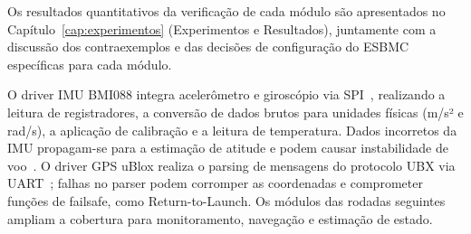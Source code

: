 Os resultados quantitativos da verificação de cada módulo  são apresentados no Capítulo~\ref{cap:experimentos} (Experimentos e Resultados), juntamente com a discussão dos contraexemplos e das decisões de configuração do ESBMC específicas para cada módulo.

O driver IMU BMI088 integra acelerômetro e
giroscópio via SPI~\cite{PX4_Documentation}, realizando a leitura de
registradores, a conversão de dados brutos para unidades físicas (m/s² e rad/s),
 a aplicação de calibração e a leitura de temperatura. Dados incorretos da IMU
propagam-se para a estimação de atitude e podem causar instabilidade de
voo~\cite{Siddiqi2022}. O driver GPS uBlox realiza o parsing de mensagens do
protocolo UBX via UART~\cite{PX4_Documentation}; falhas no parser podem
corromper as coordenadas e comprometer funções de failsafe, como Return-to-Launch.
Os módulos das rodadas seguintes ampliam a
cobertura para monitoramento, navegação e estimação de estado.

